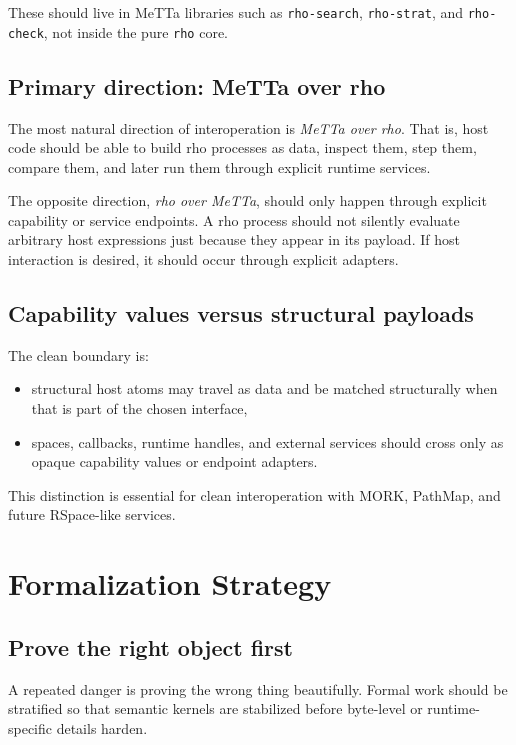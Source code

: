 \documentclass[11pt]{article}
\newcommand{\code}[1]{\texttt{#1}}
\begin{document}
These should live in MeTTa libraries such as \code{rho-search}, \code{rho-strat}, and \code{rho-check}, not inside the pure \code{rho} core.

\subsection{Primary direction: MeTTa over rho}

The most natural direction of interoperation is \emph{MeTTa over rho}. That is, host code should be able to build rho processes as data, inspect them, step them, compare them, and later run them through explicit runtime services.

The opposite direction, \emph{rho over MeTTa}, should only happen through explicit capability or service endpoints. A rho process should not silently evaluate arbitrary host expressions just because they appear in its payload. If host interaction is desired, it should occur through explicit adapters.

\subsection{Capability values versus structural payloads}

The clean boundary is:

\begin{itemize}
  \item structural host atoms may travel as data and be matched structurally when that is part of the chosen interface,
  \item spaces, callbacks, runtime handles, and external services should cross only as opaque capability values or endpoint adapters.
\end{itemize}

This distinction is essential for clean interoperation with MORK, PathMap, and future RSpace-like services.

\section{Formalization Strategy}

\subsection{Prove the right object first}

A repeated danger is proving the wrong thing beautifully. Formal work should be stratified so that semantic kernels are stabilized before byte-level or runtime-specific details harden.
\end{document}
